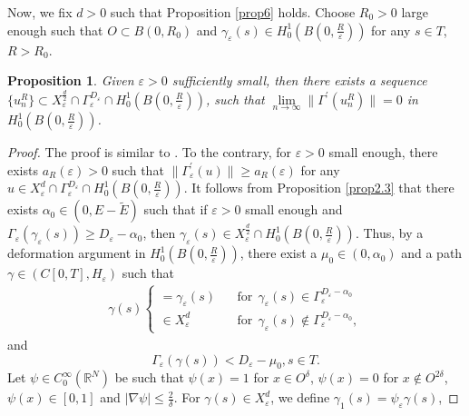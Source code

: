 \documentclass[12pt,reqno]{amsart}
\numberwithin{equation}{section}
\newtheorem{proposition}{Proposition}[section]
\begin{document}
Now, we fix $d>0$ such that Proposition \ref{prop6} holds. Choose $R_0>0$ large enough such that
$O\subset B(0, R_0)$ and $\gamma_{\varepsilon}(s)\in H_0^1(B(0,
\frac{R}{\varepsilon}))$ for any $s\in T$, $R>R_0$.

\begin{proposition}\label{prop70}
Given ${\varepsilon}>0$ sufficiently small, then there exists a sequence $\{u_n^R\}\subset
X_{\varepsilon}^{\frac{d}{2}}\cap \Gamma_{\varepsilon}^{D_{\varepsilon}}\cap
H_0^1(B(0, \frac{R}{\varepsilon}))$, such that
$\lim\limits_{n\rightarrow \infty}\|\Gamma^{'}(u_n^R)\|=0$ in
$H_0^1(B(0, \frac{R}{\varepsilon}))$.
\end{proposition}
\begin{proof}
The proof is similar to \cite{bj}. To the contrary, for
${\varepsilon}>0$ small enough, there exists $a_R({\varepsilon})>0$ such that
$\|\Gamma_{\varepsilon}^{'}(u)\|\geq a_R({\varepsilon})$ for any $u\in
X_{\varepsilon}^{d}\cap\Gamma_{\varepsilon}^{D_{\varepsilon}}\cap H_0^1(B(0,
\frac{R}{\varepsilon}))$. It follows from Proposition \ref{prop2.3} that there exists
$\alpha_0\in (0, E-\tilde{E})$ such that if ${\varepsilon}>0$ small enough and $\Gamma_{\varepsilon}(\gamma_{\varepsilon}(s))\geq D_{\varepsilon}-\alpha_0$,
then $\gamma_{\varepsilon}(s)\in X_{\varepsilon}^{\frac{d}{2}}\cap H_0^1(B(0, \frac{R}{\varepsilon}))$. Thus, by a deformation argument in $H_0^1\left(B(0,
\frac{R}{\varepsilon})\right)$, there exist a $\mu_0\in (0,\alpha_0)$
and a path $\gamma\in \left(C[0, T], H_{\varepsilon}\right)$ such that
\begin{eqnarray*}
\gamma(s)\left\{
                  \begin{array}{ll}
                    =\gamma_{\varepsilon}(s) \ \ & \ \ \text{for} \ \ \gamma_{\varepsilon}(s)\in \Gamma_{\varepsilon}^{D_{\varepsilon}-\alpha_0}\\
                    \in X_{\varepsilon}^d \ \ & \ \ \text{for} \ \ \gamma_{\varepsilon}(s)\notin \Gamma_{\varepsilon}^{D_{\varepsilon}-\alpha_0},
                  \end{array}
                \right.
\end{eqnarray*}
 and
\begin{equation}\label{4sec09}
 \Gamma_{\varepsilon}(\gamma(s))< D_{\varepsilon}-\mu_0,  s\in T.\end{equation}
Let $\psi\in C_0^{\infty}({\mathbb R}^N)$ be such that $\psi(x)=1$ for $x\in
 O^{\delta}$, $\psi(x)=0$ for $x\notin
 O^{2\delta}$, $\psi(x)\in [0,1]$ and $|\nabla \psi|\leq
 \frac{2}{\delta}$. For $\gamma(s)\in X_{\varepsilon}^d$, we define $\gamma_1(s)=\psi_{\varepsilon}\gamma(s)$,

\end{proof}
\end{document}
